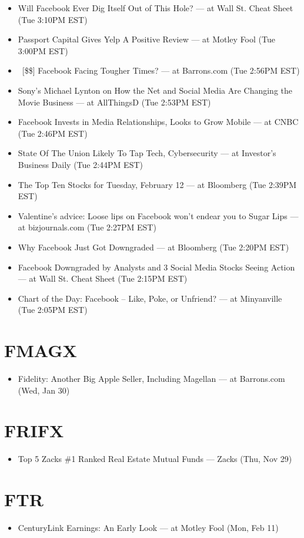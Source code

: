 \documentclass[11pt,asymmetric]{article}
\begin{document}
\begin{itemize}
\item Will Facebook Ever Dig Itself Out of This Hole? --- at Wall St. Cheat Sheet (Tue 3:10PM EST)
\item Passport Capital Gives Yelp A Positive Review --- at Motley Fool (Tue 3:00PM EST)
\item\ [\$\$] Facebook Facing Tougher Times? --- at Barrons.com (Tue 2:56PM EST)
\item Sony's Michael Lynton on How the Net and Social Media Are Changing the Movie Business --- at AllThingsD (Tue 2:53PM EST)
\item Facebook Invests in Media Relationships, Looks to Grow Mobile --- at CNBC (Tue 2:46PM EST)
\item State Of The Union Likely To Tap Tech, Cybersecurity --- at Investor's Business Daily (Tue 2:44PM EST)
\item The Top Ten Stocks for Tuesday, February 12 --- at Bloomberg (Tue 2:39PM EST)
\item Valentine’s advice: Loose lips on Facebook won’t endear you to Sugar Lips --- at bizjournals.com (Tue 2:27PM EST)
\item Why Facebook Just Got Downgraded --- at Bloomberg (Tue 2:20PM EST)
\item Facebook Downgraded by Analysts and 3 Social Media Stocks Seeing Action --- at Wall St. Cheat Sheet (Tue 2:15PM EST)
\item Chart of the Day: Facebook -- Like, Poke, or Unfriend? --- at Minyanville (Tue 2:05PM EST)
\end{itemize}

\section*{FMAGX}
\begin{itemize}
\item Fidelity: Another Big Apple Seller, Including Magellan --- at Barrons.com (Wed, Jan 30)
\end{itemize}

\section*{FRIFX}
\begin{itemize}
\item Top 5 Zacks \#1 Ranked Real Estate Mutual Funds --- Zacks (Thu, Nov 29)
\end{itemize}

\section*{FTR}
\begin{itemize}
\item CenturyLink Earnings: An Early Look --- at Motley Fool (Mon, Feb 11)
\end{itemize}
\end{document}
